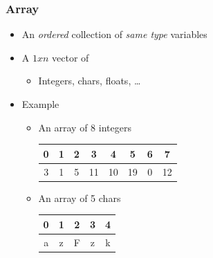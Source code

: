 \documentclass{../c-lecture}
\begin{document}
\begin{frame}
  \frametitle{Array}
  \begin{itemize}
    \item
      An \textit{\color{Orange} ordered} collection of
      \textit{\color{Orange} same type} variables

    \item A $1 x n$ vector of
    \begin{itemize}
      \item Integers, chars, floats, \ldots
    \end{itemize}
    \item Example
    \begin{itemize}
      \item An array of 8 integers
      \begin{table}
      \begin{tabular}{*{8}{c}}
        \toprule

        0 &
        1 &
        2 &
        3 &
        4 &
        5 &
        6 &
        7 \\

        \midrule

        3 &
        1 &
        5 &
        11 &
        10 &
        19 &
        0 &
        12 \\

        \bottomrule
      \end{tabular}
      \end{table}
      \item An array of 5 chars
      \begin{table}
      \begin{tabular}{*{5}{c}}
        \toprule

        0 &
        1 &
        2 &
        3 &
        4 \\

        \midrule

        a &
        z &
        F &
        z &
        k \\

        \bottomrule
      \end{tabular}
      \end{table}
    \end{itemize}
  \end{itemize}
\end{frame}
\end{document}

